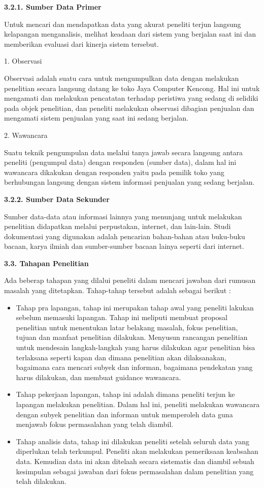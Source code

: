 \documentclass[11pt]{article}
\begin{document}
\textbf{3.2.1. Sumber Data Primer}

Untuk mencari dan mendapatkan data yang akurat peneliti terjun langsung kelapangan menganalisis, melihat keadaan dari sistem yang berjalan saat ini  dan memberikan evaluasi dari kinerja sistem tersebut.

1. Observasi

Observasi adalah suatu cara untuk mengumpulkan data dengan melakukan penelitian secara langsung datang ke toko Jaya Computer Kencong. Hal ini untuk mengamati dan melakukan pencatatan terhadap peristiwa yang sedang di selidiki pada objek penelitian, dan peneliti melakukan observasi dibagian penjualan dan mengamati sistem penjualan yang saat ini sedang berjalan.

2. Wawancara

Suatu teknik pengumpulan data melalui tanya jawab secara langsung antara peneliti (pengumpul data) dengan responden (sumber data), dalam hal ini wawancara dikakukan dengan responden yaitu pada pemilik toko yang berhubungan langsung dengan sistem informasi penjualan yang sedang berjalan.

\textbf{3.2.2. Sumber Data Sekunder}

Sumber data-data atau informasi lainnya yang menunjang untuk melakukan penelitian didapatkan  melalui perpustakan, internet, dan lain-lain. Studi dokumentasi yang digunakan adalah pencarian bahan-bahan atau buku-buku bacaan, karya ilmiah dan sumber-sumber bacaan lainya seperti dari internet.

\textbf{3.3. Tahapan Penelitian}

Ada beberap tahapan yang dilalui peneliti dalam mencari jawaban dari rumusan
masalah yang ditetapkan. Tahap-tahap tersebut adalah sebagai berikut :

\begin{itemize}
	\item Tahap pra lapangan, tahap ini merupakan tahap awal yang peneliti lakukan sebelum memasuki lapangan. Tahap ini meliputi membuat proposal penelitian untuk menentukan latar belakang masalah, fokus penelitian, tujuan dan manfaat penelitian dilakukan. Menyusun rancangan penelitian untuk mendesain langkah-langkah yang harus dilakukan agar penelitian bisa terlaksana seperti kapan dan dimana penelitian akan dilaksanakan, bagaimana cara mencari subyek dan informan, bagaimana pendekatan yang harus dilakukan, dan membuat guidance wawancara.
	\item Tahap pekerjaan lapangan, tahap ini adalah dimana peneliti terjun ke lapangan melakukan penelitian. Dalam hal ini, peneliti melakukan wawancara dengan subyek penelitian dan informan untuk memperoleh data guna menjawab fokus permasalahan yang telah diambil.
	\item Tahap analisis data, tahap ini dilakukan peneliti setelah seluruh data yang diperlukan telah terkumpul. Peneliti akan melakukan pemeriksaan keabsahan data. Kemudian data ini akan ditelaah secara sistematis dan diambil sebuah kesimpulan sebagai jawaban dari fokus permasalahan dalam penelitian yang telah dilakukan.
\end{itemize}
\end{document}
